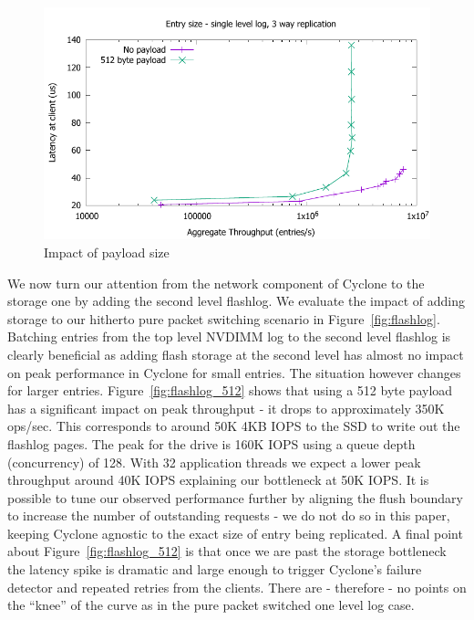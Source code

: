 \documentclass[10pt, preprint, nonatbib]{sigplanconf}
\begin{document}
\begin{figure}
\includegraphics[scale=0.6]{results2/512.pdf}
\caption{Impact of payload size}
\label{fig:payload}
\end{figure}

We now turn our attention from the network component of Cyclone to the storage
one by adding the second level flashlog. We evaluate the impact of adding
storage to our hitherto pure packet switching scenario in
Figure~\ref{fig:flashlog}. Batching entries from the top level NVDIMM log to the
second level flashlog is clearly beneficial as adding flash storage at the
second level has almost no impact on peak performance in Cyclone for small
entries. The situation however changes for larger
entries. Figure~\ref{fig:flashlog_512} shows that using a 512 byte payload has a
significant impact on peak throughput - it drops to approximately 350K
ops/sec. This corresponds to around 50K 4KB IOPS to the SSD to write out the
flashlog pages. The peak for the drive is 160K IOPS using a queue depth
(concurrency) of 128. With 32 application threads we expect a lower peak
throughput around 40K IOPS explaining our bottleneck at 50K IOPS.  It is
possible to tune our observed performance further by aligning the flush boundary
to increase the number of outstanding requests - we do not do so in this paper,
keeping Cyclone agnostic to the exact size of entry being replicated. A final
point about Figure~\ref{fig:flashlog_512} is that once we are past the storage
bottleneck the latency spike is dramatic and large enough to trigger Cyclone's
failure detector and repeated retries from the clients. There are - therefore -
no points on the ``knee'' of the curve as in the pure packet switched one level
log case.
\end{document}
